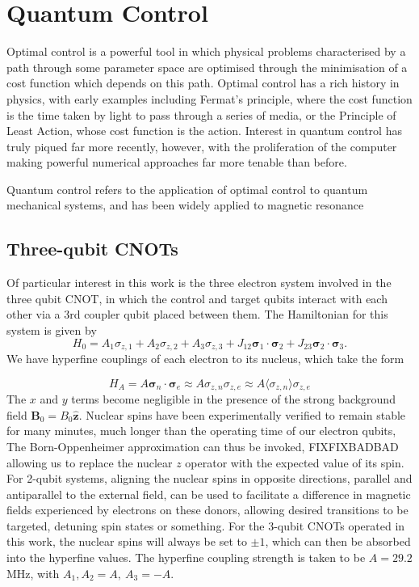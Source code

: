 \documentclass[../Thesis.tex]{subfiles}
\begin{document}
\chapter{Quantum Control}

Optimal control is a powerful tool in which physical problems characterised by a path through some parameter space are optimised through the minimisation of a cost function which depends on this path. Optimal control has a rich history in physics, with early examples including Fermat's principle, where the cost function is the time taken by light to pass through a series of media, or the Principle of Least Action, whose cost function is the action.\cite{sargent_optimal_2000} Interest in quantum control has truly piqued far more recently, however, with the proliferation of the computer making powerful numerical approaches far more tenable than before. 

Quantum control refers to the application of optimal control to quantum mechanical systems, and has been widely applied to magnetic resonance\cite{conolly_optimal_1986}

\section{Three-qubit CNOTs}
Of particular interest in this work is the three electron system involved in the three qubit CNOT, in which the control and target qubits interact with each other via a 3rd coupler qubit placed between them. The Hamiltonian for this system is given by
\begin{equation}
    H_0 = A_1\sigma_{z,1} + A_2\sigma_{z,2}+A_3\sigma_{z,3} + J_{12}\bm{\sigma}_1\cdot\bm{\sigma}_2 + J_{23}\bm{\sigma}_2\cdot\bm{\sigma}_3.
\end{equation}
We have hyperfine couplings of each electron to its nucleus, which take the form

\begin{equation}
    H_A = A\bm{\sigma}_n\cdot\bm{\sigma}_e\approx A\sigma_{z,n}\sigma_{z,e}\approx A\langle \sigma_{z,n}\rangle \sigma_{z,e}
\end{equation}
The $x$ and $y$ terms become negligible in the presence of the strong background field $\bm{B}_0=B_0\bm{\hat{z}}$. Nuclear spins have been experimentally verified to remain stable for many minutes\cite{pla_high-fidelity_2013}, much longer than the operating time of our electron qubits, The Born-Oppenheimer approximation can thus be invoked, FIXFIXBADBAD allowing us to replace the nuclear $z$ operator with the expected value of its spin. For 2-qubit systems, aligning the nuclear spins in opposite directions, parallel and antiparallel to the external field, can be used to facilitate a difference in magnetic fields experienced by electrons on these donors, allowing desired transitions to be targeted, detuning spin states or something.\cite{kalra_robust_2014}  For the 3-qubit CNOTs operated in this work, the nuclear spins will always be set to $\pm 1$, which can then be absorbed into the hyperfine values. The hyperfine coupling strength is taken to be $A=29.2$ MHz, \cite{kane_silicon-based_1998,tsai_optimal_2009,kalra_robust_2014} with $A_1,A_2=A,\ A_3=-A$. 
\end{document}
